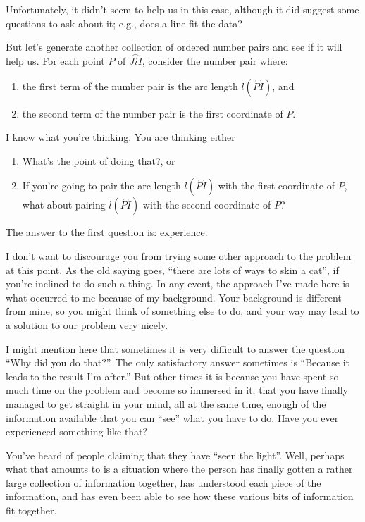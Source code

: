 \documentclass[english]{book}
\newcommand{\arc}[1]{\overset{\frown}{#1} }
\begin{document}
Unfortunately, it didn't seem to help us in this case, although it did suggest some questions to ask about it; e.g., does a line fit the data?

But let's generate another collection of ordered number pairs and see if it will help us. For each point $P$ of $\arc{JiI}$, consider the number pair where:
\begin{enumerate}[\hspace{1cm}a)]
  \item the first term of the number pair is the arc length $l(\arc{PI})$, and
  \item the second term of the number pair is the first coordinate of $P$.
\end{enumerate}
I know what you're thinking. You are thinking either
\begin{enumerate}[\hspace{1cm}1)]
  \item What's the point of doing that?, or
  \item If you're going to pair the arc length $l(\arc{PI})$ with the first coordinate of $P$, what about pairing $l(\arc{PI})$ with the second coordinate of $P$?
\end{enumerate}
The answer to the first question is: experience.

I don't want to discourage you from trying some other approach to the problem at this point. As the old saying goes, ``there are lots of ways to skin a cat'', if you're inclined to do such a thing. In any event, the approach I've made here is what occurred to me because of my background. Your background is different from mine, so you might think of something else to do, and your way may lead to a solution to our problem very nicely. 

I might mention here that sometimes it is very difficult to answer the question ``Why did you do that?''. The only satisfactory answer sometimes is ``Because it leads to the result I'm after.'' But other times it is because you have spent so much time on the problem and become so immersed in it, that you have finally managed to get straight in your mind, all at the same time, enough of the information available that you can ``see'' what you have to do. Have you ever experienced something like that? 

\vfill

You've heard of people claiming that they have ``seen the light''. Well, perhaps what that amounts to is a situation where the person has finally gotten a rather large collection of information together, has understood each piece of the information, and has even been able to see how these various bits of information fit together. 
\end{document}
